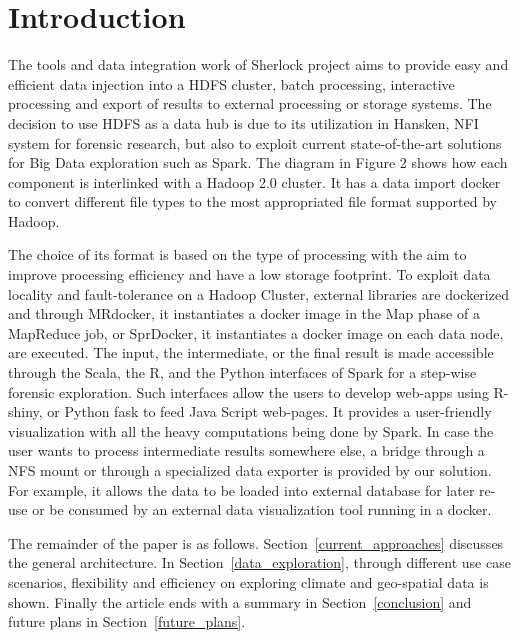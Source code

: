 \section{Introduction}
\label{introduction}

The tools and data integration work of Sherlock project aims to provide easy and efficient data injection
into a HDFS cluster, batch processing, interactive processing and export of results to external processing
or storage systems. The decision to use HDFS as a data hub is due to its utilization in Hansken, NFI system
for forensic research, but also to exploit current state-of-the-art solutions for Big Data exploration such
as Spark. The diagram in Figure 2 shows how each component is interlinked with a Hadoop 2.0 cluster. It has
a data import docker to convert different file types to the most appropriated file format supported by Hadoop.

The choice of its format is based on the type of processing with the aim to improve processing efficiency
and have a low storage footprint. To exploit data locality and fault-tolerance on a Hadoop Cluster, external
libraries are dockerized and through MRdocker, it instantiates a docker image in the Map phase of a MapReduce
job, or SprDocker, it instantiates a docker image on each data node, are executed. The input, the intermediate,
or the final result is made accessible through the Scala, the R, and the Python interfaces of Spark for a
step-wise forensic exploration. Such interfaces allow the users to develop web-apps using R-shiny, or Python
fask to feed Java Script web-pages. It provides a user-friendly visualization with all the heavy computations
being done by Spark. In case the user wants to process intermediate results somewhere else, a bridge through
a NFS mount or through a specialized data exporter is provided by our solution. For example, it allows the
data to be loaded into external database for later re-use or be consumed by an external data visualization
tool running in a docker. 

The remainder of the paper is as follows. Section~\ref{current_approaches} discusses the general
architecture. In Section~\ref{data_exploration}, through different use case scenarios, flexibility
and efficiency on exploring climate and geo-spatial data is shown. Finally the article ends with
a summary in Section~\ref{conclusion} and future plans in Section~\ref{future_plans}.
